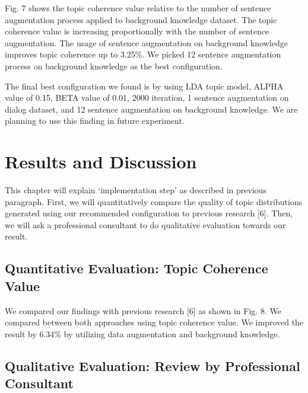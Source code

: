 \documentclass[senior]{IPSstyle}
\begin{document}
Fig. 7 shows the topic coherence value relative to the number of sentence augmentation process applied to background knowledge dataset. The topic coherence value is increasing proportionally with the number of sentence augmentation. The usage of sentence augmentation on background knowledge improves topic coherence up to 3.25\%. We picked 12 sentence augmentation process on background knowledge as the best configuration.

The final best configuration we found is by using LDA topic model, ALPHA value of 0.15, BETA value of 0.01, 2000 iteration, 1 sentence augmentation on dialog dataset, and 12 sentence augmentation on background knowledge. We are planning to use this finding in future experiment.

\chapter{Results and Discussion} 

This chapter will explain ‘implementation step’ as described in previous paragraph. First, we will quantitatively compare the quality of topic distributions generated using our recommended configuration to previous research [6]. Then, we will ask a professional consultant to do qualitative evaluation towards our result.

\section{Quantitative Evaluation: Topic Coherence Value}

We compared our findings with previous research [6] as shown in Fig. 8. We compared between both approaches using topic coherence value. We improved the result by 6.34\% by utilizing data augmentation and background knowledge.

\section{Qualitative Evaluation: Review by Professional Consultant}
\end{document}
